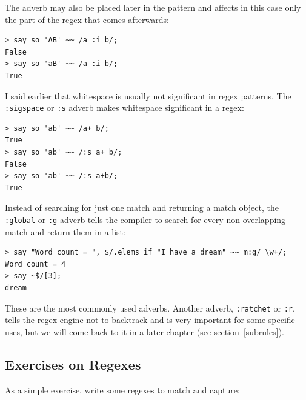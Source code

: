 The adverb may also be placed later in the pattern and affects 
in this case only the part of the regex that comes afterwards:

\begin{verbatim}
> say so 'AB' ~~ /a :i b/;
False
> say so 'aB' ~~ /a :i b/;
True
\end{verbatim}
%

I said earlier that whitespace is usually not significant 
in regex patterns. The \verb':sigspace' or \verb':s' adverb 
makes whitespace significant in a regex:

\begin{verbatim}
> say so 'ab' ~~ /a+ b/;
True
> say so 'ab' ~~ /:s a+ b/;
False
> say so 'ab' ~~ /:s a+b/;
True
\end{verbatim}
%

Instead of searching for just one match and returning a 
match object, the \verb':global' or \verb':g' adverb tells
the compiler to search for every non-overlapping match 
and return them in a list:

\begin{verbatim}
> say "Word count = ", $/.elems if "I have a dream" ~~ m:g/ \w+/;
Word count = 4
> say ~$/[3];
dream
\end{verbatim}
%

These are the most commonly used adverbs. Another adverb, 
\verb':ratchet' or \verb':r', tells the regex engine 
not to backtrack and is very important for some specific 
uses, but we will come back to it in a later chapter (see 
section~\ref{subrules}).

\subsection{Exercises on Regexes}
\label{regex_exercises}

As a simple exercise, write some regexes to match and capture:

